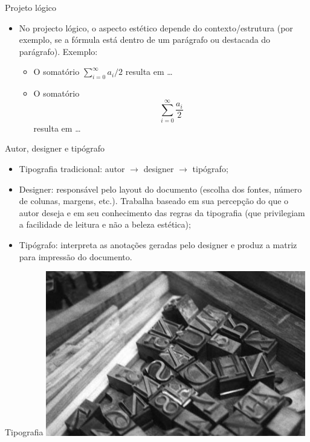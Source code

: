 \begin{frame}{Projeto lógico}
\begin{itemize}
	\item No projecto lógico, o aspecto estético depende do contexto/estrutura (por 
	exemplo, se a fórmula está dentro de um parágrafo ou destacada do parágrafo). 
	Exemplo:
	\begin{itemize}
		\item O somatório $\sum_{i=0}^\infty a_i/2$ resulta em \dots		
		\item O somatório \[\sum_{i=0}^\infty \frac{a_i}{2}\] resulta em \dots
	\end{itemize}
\end{itemize}
\end{frame}

\begin{frame}{Autor, designer e tipógrafo}
\begin{itemize}
\item Tipografia tradicional: autor $\longrightarrow$ designer $\longrightarrow$ tipógrafo;
\item Designer: responsável pelo layout do documento (escolha dos fontes, número de colunas, margens, etc.). Trabalha baseado em sua percepção do que o autor deseja e em seu conhecimento das regras da tipografia (que privilegiam a facilidade de leitura e não a beleza estética);
\item Tipógrafo: interpreta as anotações geradas pelo designer e produz a matriz para impressão do documento.
\end{itemize}
\end{frame}

\begin{frame}{Tipografia}
\centering\includegraphics[width=0.85\textwidth]{img/tipografia.pdf}
\end{frame}

